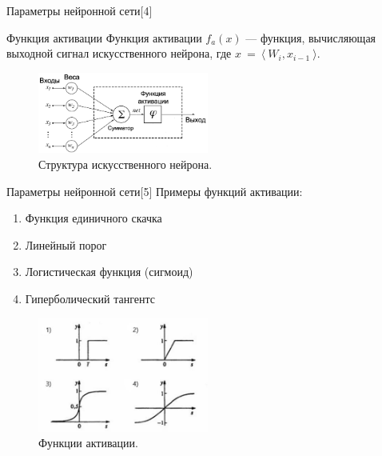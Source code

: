 \documentclass{beamer}
\begin{document}
\begin{frame}{Параметры нейронной сети[4]}
\begin{block}{Функция активации}
Функция активации $f_a(x)$ --- функция, вычисляющая выходной сигнал искусственного нейрона, где $x~=~\langle~W_i, x_{i-1}~\rangle$.
\end{block}

\begin{figure}[h]
    \centering
  \includegraphics[width=0.5\textwidth]{nuron_model.png}
  \caption{Структура искусственного нейрона.}
  \label{fig:neuron}

\end{figure}

\end{frame}






\begin{frame}{Параметры нейронной сети[5]}
Примеры функций активации:
\begin{enumerate}
\item Функция единичного скачка
\item Линейный порог
\item Логистическая функция (сигмоид)
\item Гиперболический тангентс 
\end{enumerate}

\begin{figure}[h]
    \centering
  \includegraphics[width=0.5\textwidth]{activation_functions.jpg}
  \caption{Функции активации.}
  \label{fig:activations}
\end{figure}

\end{frame}
\end{document}

